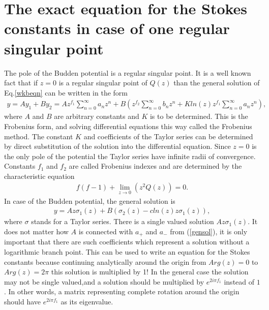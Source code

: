 \documentclass[aip,jmp,reprint]{revtex4-1}
\begin{document}
\section{The exact equation for the Stokes constants in case of one regular singular point \label{frob}}
The pole of the Budden potential is a regular singular point. It is a well known fact\cite[pp~68-76]{bender} that if \mbox{$z=0$} is a regular singular point of $Q(z)$ than the general solution of Eq.\ref{wkbeqn} can be written in the form
\begin{eqnarray}
y=A y_1+B y_2=
Az^{f_1}\sum_{n=0}^{\infty}{a_n z^n}+B(z^{f_2}\sum_{n=0}^{\infty}{b_n z^n}+Kln(z)z^{f_1}\sum_{n=0}^{\infty}{a_n z^n}),    \label{frobgensol}
\end{eqnarray}
where $A$ and $B$ are arbitrary constants and $K$ is to be determined. This is the Frobenius form, and solving differential equations this way called the Frobenius method. The constant $K$ and coefficients of the Taylor series can be determined by direct substitution of the solution into the differential equation. Since \mbox{$z=0$} is the only pole of the potential the Taylor series have infinite radii of convergence. Constants $f_1$ and $f_2$ are called Frobenius indexes and are determined by the characteristic equation
\begin{eqnarray}
f(f-1)+\lim_{z\rightarrow 0}(z^2Q(z))=0.   \label{chareq}
\end{eqnarray}
In case of the Budden potential, the general solution is
\begin{eqnarray}
y=A z \sigma_1(z)+B(\sigma_2(z) - c ln(z)z\sigma_1(z)),   \label{genfrobbud}
\end{eqnarray}
where $\sigma$ stands for a Taylor series. There is a single valued solution \mbox{$A z \sigma_1(z)$}. It does not matter how $A$ is connected with $a_+$ and $a_-$ from (\ref{gensol}), it is only important that there are such coefficients which represent a solution without a logarithmic branch point. This can be used to write an equation for the Stokes constants because continuing analytically around the origin from \mbox{$Arg(z)=0$} to \mbox{$Arg(z)=2\pi$} this solution is  multiplied by 1! In the general case the solution may not be single valued,and  a solution should be multiplied by $e^{2i\pi f_1}$ instead of $1$. In other words, a matrix representing complete rotation around the origin should have $e^{2i\pi f_1}$ as its eigenvalue. 
\end{document}
